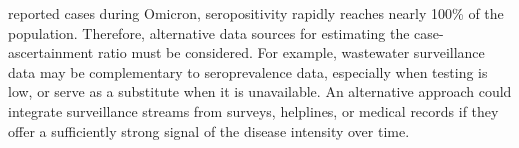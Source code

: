 reported cases during Omicron, \citep{ruff2022rapid, nyreinfect2021,
hireinfect2022, wareinfect2022} seropositivity rapidly reaches nearly 100\% of
the population. Therefore, alternative data sources for estimating the
case-ascertainment ratio must be considered. For example, wastewater
surveillance data may be complementary to seroprevalence data, especially when
testing is low, or serve as a substitute when it is unavailable.
\citep{mcmanus2023predicting} %
An alternative approach could integrate surveillance streams from
surveys, helplines, or medical records if they
offer a sufficiently strong signal of the disease intensity over time.
\citep{reinhart2021open,ecdc2020strategies}



